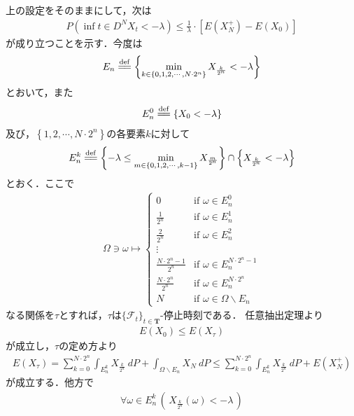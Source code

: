 	上の設定をそのままにして，次は
	\begin{align}
		P\left(\inf{t \in D^N}{X_t} < -\lambda\right)
		\leq \frac{1}{\lambda} \cdot \left[E\left(X_N^+\right) - E(X_0)\right]
	\end{align}
	が成り立つことを示す．今度は
	\begin{align}
		E_n \defeq  \left\{\min_{k \in \left\{0,1,2,\cdots,N \cdot 2^n\right\}} X_{\frac{k}{2^n}} < -\lambda\right\}
	\end{align}
	とおいて，また
	\begin{align}
		E_n^0 \defeq \left\{X_0 < -\lambda\right\}
	\end{align}
	及び，$\left\{1,2,\cdots,N \cdot 2^n\right\}$の各要素$k$に対して
	\begin{align}
		E_n^k \defeq \left\{ -\lambda \leq \min_{m \in \left\{0,1,2,\cdots,k-1\right\}} X_{\frac{m}{2^n}} \right\} \cap \left\{ X_{\frac{k}{2^n}} < -\lambda \right\}
	\end{align}
	とおく．ここで
	\begin{align}
		\Omega \ni \omega \longmapsto
		\begin{cases}
			0 & \mbox{if } \omega \in E_n^0 \\
			\frac{1}{2^n} & \mbox{if } \omega \in E_n^1 \\
			\frac{2}{2^n} & \mbox{if } \omega \in E_n^2 \\
			\vdots & \\
			\frac{N \cdot 2^n - 1}{2^n} & \mbox{if } \omega \in E_n^{N \cdot 2^n - 1} \\
			\frac{N \cdot 2^n}{2^n} & \mbox{if } \omega \in E_n^{N \cdot 2^n} \\
			N & \mbox{if } \omega \in \Omega \backslash E_n
		\end{cases}
	\end{align}
	なる関係を$\tau$とすれば，$\tau$は$\{\mathscr{F}_t\}_{t \in \mathbf{T}}$-停止時刻である．
	任意抽出定理より
	\begin{align}
		E(X_0) \leq E(X_\tau)
	\end{align}
	が成立し，$\tau$の定め方より
	\begin{align}
		E(X_\tau) = \sum_{k=0}^{N \cdot 2^n} \int_{E_n^k} X_{\frac{k}{2^n}}\ dP + \int_{\Omega \backslash E_n} X_N\ dP
		\leq \sum_{k=0}^{N \cdot 2^n} \int_{E_n^k} X_{\frac{k}{2^n}}\ dP + E\left(X_N^+\right)
	\end{align}
	が成立する．他方で
	\begin{align}
		\forall \omega \in E_n^k\, \left(\, X_{\frac{k}{2^n}}(\omega) < -\lambda\, \right)
	\end{align}

